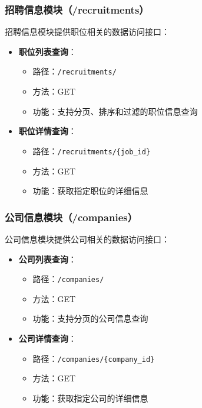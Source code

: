 \subsubsection{招聘信息模块（/recruitments）}
招聘信息模块提供职位相关的数据访问接口：

\begin{itemize}
    \item \textbf{职位列表查询}：
    \begin{itemize}
        \item 路径：\texttt{/recruitments/}
        \item 方法：GET
        \item 功能：支持分页、排序和过滤的职位信息查询
    \end{itemize}
    
    \item \textbf{职位详情查询}：
    \begin{itemize}
        \item 路径：\texttt{/recruitments/\{job\_id\}}
        \item 方法：GET
        \item 功能：获取指定职位的详细信息
    \end{itemize}
\end{itemize}

\subsubsection{公司信息模块（/companies）}
公司信息模块提供公司相关的数据访问接口：

\begin{itemize}
    \item \textbf{公司列表查询}：
    \begin{itemize}
        \item 路径：\texttt{/companies/}
        \item 方法：GET
        \item 功能：支持分页的公司信息查询
    \end{itemize}
    
    \item \textbf{公司详情查询}：
    \begin{itemize}
        \item 路径：\texttt{/companies/\{company\_id\}}
        \item 方法：GET
        \item 功能：获取指定公司的详细信息
    \end{itemize}
\end{itemize}

